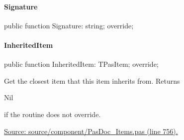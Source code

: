 \documentclass{report}
\newif\ifpdf
\begin{document}
\paragraph*{Signature}\hspace*{\fill}

\label{PasDoc_Items.TPasRoutine-Signature}
\begin{list}{}{
\setlength{\itemindent}{0cm}
\setlength{\listparindent}{0cm}
\setlength{\leftmargin}{\evensidemargin}
\addtolength{\leftmargin}{\tmplength}
\settowidth{\labelsep}{X}
\addtolength{\leftmargin}{\labelsep}
\setlength{\labelwidth}{\tmplength}
}
\item[\textbf{Declaration}\hfill]
\ifpdf
\begin{flushleft}
\fi
\begin{ttfamily}
public function Signature: string; override;\end{ttfamily}

\ifpdf
\end{flushleft}
\fi

\end{list}
\paragraph*{InheritedItem}\hspace*{\fill}

\label{PasDoc_Items.TPasRoutine-InheritedItem}
\begin{list}{}{
\setlength{\itemindent}{0cm}
\setlength{\listparindent}{0cm}
\setlength{\leftmargin}{\evensidemargin}
\addtolength{\leftmargin}{\tmplength}
\settowidth{\labelsep}{X}
\addtolength{\leftmargin}{\labelsep}
\setlength{\labelwidth}{\tmplength}
}
\item[\textbf{Declaration}\hfill]
\ifpdf
\begin{flushleft}
\fi
\begin{ttfamily}
public function InheritedItem: TPasItem; override;\end{ttfamily}

\ifpdf
\end{flushleft}
\fi

\par
\item[\textbf{Description}]
Get the closest item that this item inherits from. Returns \begin{ttfamily}Nil\end{ttfamily} if the routine does not override.\par
\href{https://github.com/pasdoc/pasdoc/blob/master/source/component/PasDoc_Items.pas#L756}{Source: source/component/PasDoc{\_}Items.pas (line 756).}

\end{list}
\end{document}
